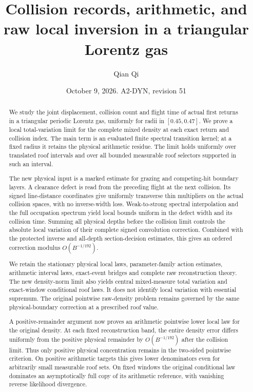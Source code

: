 \documentclass[11pt,reqno]{amsart}
\title[Collision records and raw local inversion]{Collision records, arithmetic, and raw local inversion in a triangular Lorentz gas}
\author{Qian Qi}
\date{October 9, 2026. A2-DYN, revision 51}
\numberwithin{equation}{section}
\theoremstyle{definition}\newtheorem{definition}[theorem]{Definition}
\theoremstyle{remark}\newtheorem{remark}[theorem]{Remark}
\begin{document}
\raggedbottom
\begin{abstract}
We study the joint displacement, collision count and flight time of
actual first returns in a triangular periodic Lorentz gas, uniformly
for radii in $[0.45,0.47]$. We prove a local total-variation limit for
the complete mixed density at each exact return and collision index.
The main term is an evaluated finite spectral transition kernel; at a
fixed radius it retains the physical arithmetic residue. The limit
holds uniformly over translated roof intervals and over all bounded
measurable roof selectors supported in such an interval.

The new physical input is a marked estimate for grazing and
competing-hit boundary layers. A clearance defect is read from the
preceding flight at the next collision. Its signed line-distance
coordinates give uniformly transverse thin multipliers on the actual
collision spaces, with no inverse-width loss. Weak-to-strong spectral
interpolation and the full occupation spectrum yield local bounds
uniform in the defect width and its collision time. Summing all
physical depths before the collision limit controls the absolute
local variation of their complete signed convolution correction.
Combined with the protected inverse and all-depth section-decision
estimates, this gives an ordered correction modulus $O(B^{-1/192})$.

We retain the stationary physical local laws, parameter-family action
estimates, arithmetic interval laws, exact-event bridges and complete
raw reconstruction theory. The new density-norm limit also yields
central mixed-measure total variation and exact-window conditional
roof laws. It does not identify local variation with essential
supremum. The original pointwise raw-density problem remains governed
by the same physical-boundary correction at a prescribed roof value.

A positive-remainder argument now proves an arithmetic pointwise lower
local law for the original density. At each fixed reconstruction band,
the entire density error differs uniformly from the positive physical
remainder by $O(B^{-1/192})$ after the collision limit. Thus only positive
physical concentration remains in the two-sided pointwise criterion.
On positive arithmetic targets this gives lower denominators even for
arbitrarily small measurable roof sets. On fixed windows the original
conditional law dominates an asymptotically full copy of its arithmetic
reference, with vanishing reverse likelihood divergence.
\end{abstract}
\maketitle
\end{document}
